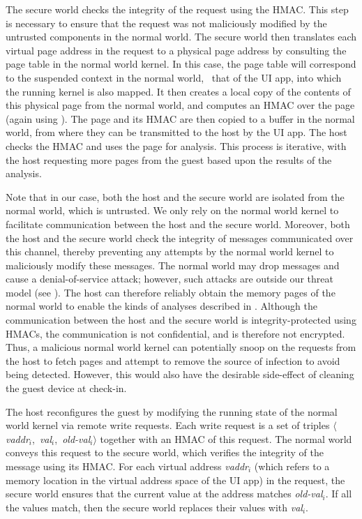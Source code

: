 The secure world checks the integrity of the request using the HMAC. This step
is necessary to ensure that the request was not maliciously modified by the
untrusted components in the normal world. The secure world then translates each
virtual page address in the request to a physical page address by consulting
the page table in the normal world kernel. In this case, the page table will
correspond to the suspended context in the normal world, \ie~that of the UI
app, into which the running kernel is also mapped.  It then creates a
local copy of the contents of this physical page from the normal world, and
computes an HMAC over the page (again using \ks). The page and its HMAC are
then copied to a buffer in the normal world, from where they can be transmitted
to the host by the UI app.  The host checks the HMAC and uses the page for
analysis. This process is iterative, with the host requesting more pages from
the guest based upon the results of the analysis.

Note that in our case, both the host and the secure world are isolated from the
normal world, which is untrusted. We only rely on the normal world kernel to
facilitate communication between the host and the secure world. Moreover, both
the host and the secure world check the integrity of messages communicated over
this channel, thereby preventing any attempts by the normal world kernel to
maliciously modify these messages.  The normal world may drop messages and
cause a denial-of-service attack; however, such attacks are outside our threat
model (see ). The host can therefore reliably obtain
the memory pages of the normal world to enable the kinds of analyses described
in . Although the communication between the
host and the secure world is integrity-protected using HMACs, the communication
is not confidential, and is therefore not encrypted. Thus, a malicious normal
world kernel can potentially snoop on the requests from the host to fetch pages
and attempt to remove the source of infection to avoid being detected. However,
this would also have the desirable side-effect of cleaning the guest device at
check-in.

%
The host reconfigures the guest by modifying the running state of the normal
world kernel via remote write requests. Each write request is a set of triples
$\langle$\textit{vaddr}$_i$,~\textit{val}$_i$,~\textit{old-val}$_i$$\rangle$
together with an HMAC of this request. The normal world conveys this request to
the secure world, which verifies the integrity of the message using its HMAC.
For each virtual address \textit{vaddr}$_i$ (which refers to a memory location
in the virtual address space of the UI app) in the request, the secure world
ensures that the current value at the address matches \textit{old-val}$_i$.  If
all the values match, then the secure world replaces their values with
\textit{val}$_i$. 

